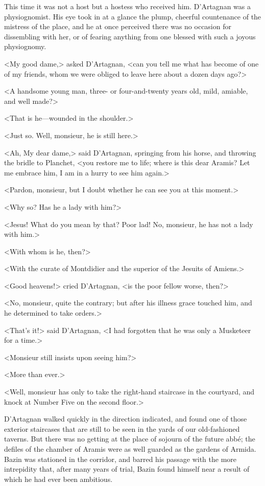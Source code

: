 This time it was not a host but a hostess who received him. D'Artagnan was a physiognomist. His eye took in at a glance the plump, cheerful countenance of the mistress of the place, and he at once perceived there was no occasion for dissembling with her, or of fearing anything from one blessed with such a joyous physiognomy. 

<My good dame,> asked D'Artagnan, <can you tell me what has become of one of my friends, whom we were obliged to leave here about a dozen days ago?> 

<A handsome young man, three- or four-and-twenty years old, mild, amiable, and well made?> 

<That is he—wounded in the shoulder.> 

<Just so. Well, monsieur, he is still here.> 

<Ah,  My dear dame,> said D'Artagnan, springing from his horse, and throwing the bridle to Planchet, <you restore me to life; where is this dear Aramis? Let me embrace him, I am in a hurry to see him again.> 

<Pardon, monsieur, but I doubt whether he can see you at this moment.> 

<Why so? Has he a lady with him?> 

<Jesus! What do you mean by that? Poor lad! No, monsieur, he has not a lady with him.> 

<With whom is he, then?> 

<With the curate of Montdidier and the superior of the Jesuits of Amiens.> 

<Good heavens!> cried D'Artagnan, <is the poor fellow worse, then?> 

<No, monsieur, quite the contrary; but after his illness grace touched him, and he determined to take orders.> 

<That's it!> said D'Artagnan, <I had forgotten that he was only a Musketeer for a time.> 

<Monsieur still insists upon seeing him?> 

<More than ever.> 

<Well, monsieur has only to take the right-hand staircase in the courtyard, and knock at Number Five on the second floor.> 

D'Artagnan walked quickly in the direction indicated, and found one of those exterior staircases that are still to be seen in the yards of our old-fashioned taverns. But there was no getting at the place of sojourn of the future abbé; the defiles of the chamber of Aramis were as well guarded as the gardens of Armida. Bazin was stationed in the corridor, and barred his passage with the more intrepidity that, after many years of trial, Bazin found himself near a result of which he had ever been ambitious. 

